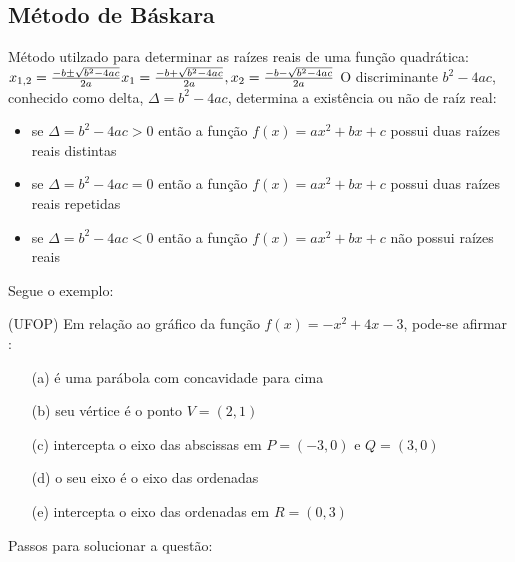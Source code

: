 \begin{multicols*}{2}
\begin{itemize}[wide, labelwidth=!, labelindent=0pt]
              \subsection*{Método de Báskara}
              Método utilzado para determinar as raízes reais de uma função quadrática:
              $
                  x_{1,2} = \frac{- b \pm \sqrt{b^2 - 4ac} }{2a} \\
                  x_1 = \frac{- b + \sqrt{b^2 - 4ac} }{2a} ,
                  x_2 = \frac{- b - \sqrt{b^2 - 4ac} }{2a}
              $
              O discriminante $b^2 - 4ac$, conhecido como delta, $\Delta = b^2 - 4ac$, determina a existência 		ou não de raíz real:
              \begin{itemize}
                  \item se $\Delta = b^2 - 4ac > 0 $ então a função $f(x) = ax^2 + bx + c$ possui duas raízes 			reais distintas
                  \item se $\Delta = b^2 - 4ac = 0 $ então a função $f(x) = ax^2 + bx + c$ possui duas raízes 			reais repetidas
                  \item se $\Delta = b^2 - 4ac < 0 $  então a função $f(x) = ax^2 + bx + c$ não possui raízes 			reais
              \end{itemize}
    \end{itemize}
    Segue o exemplo:

    (UFOP) Em relação ao gráfico da função $f(x) = -x^2 + 4x -3$, pode-se afirmar :
    \begin{itemize}
        \item[(a)]é uma parábola com concavidade para cima
        \item[(b)]seu vértice é o ponto $V = (2,1)$
        \item[(c)] intercepta o eixo das abscissas em  $P = (-3,0)$ e $Q = (3,0)$
        \item[(d)]o seu eixo é o eixo das ordenadas
        \item[(e)]intercepta o eixo das ordenadas em $R = (0,3)$
    \end{itemize}
    Passos para solucionar a questão:


\end{multicols*}
